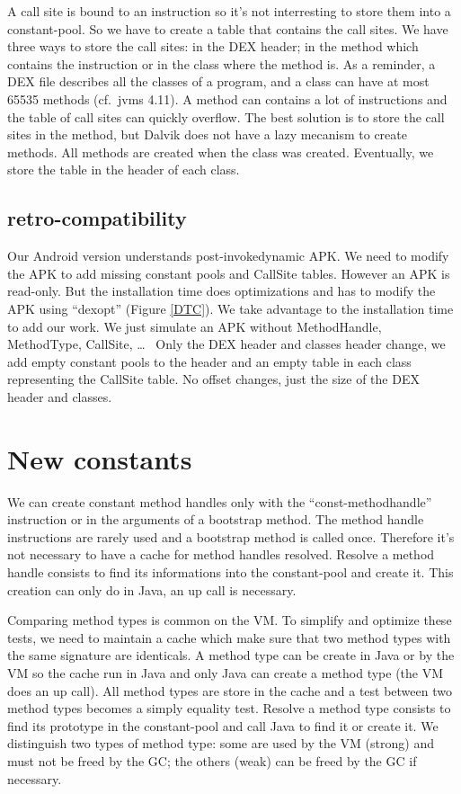 \documentclass{sig-alternate}
\def \DALVIK{Dalvik\xspace}
\def \ANDROID{Android\xspace}
\begin{document}
    A call site is bound to an instruction so it's not interresting to store them into a constant-pool.
    So we have to create a table that contains the call sites.
    We have three ways to store the call sites: in the DEX header; in the method which contains the instruction or in the class where the method is.
    As a reminder, a DEX file describes all the classes of a program, and a class can have at most 65535 methods (cf.~jvms 4.11).
    A method can contains a lot of instructions and the table of call sites can quickly overflow.
    The best solution is to store the call sites in the method, but \DALVIK does not have a lazy mecanism to create methods.
    All methods are created when the class was created.
    Eventually, we store the table in the header of each class.

  \subsection{retro-compatibility}
    Our \ANDROID version understands post-invokedynamic APK.
    We need to modify the APK to add missing constant pools and CallSite tables.
    However an APK is read-only.
    But the installation time does optimizations and has to modify the APK using ``dexopt'' (Figure \ref{DTC}).
    We take advantage to the installation time to add our work.
    We just simulate an APK without MethodHandle, MethodType, CallSite, \dots~%
    Only the DEX header and classes header change, we add empty constant pools to the header
    and an empty table in each class representing the CallSite table.
    No offset changes, just the size of the DEX header and classes.

\section{New constants}

  We can create constant method handles only with the ``const-methodhandle'' instruction or in the arguments of a bootstrap method.
  The method handle instructions are rarely used and a bootstrap method is called once.
  Therefore it's not necessary to have a cache for method handles resolved.
  Resolve a method handle consists to find its informations into the constant-pool and create it.
  This creation can only do in Java, an up call is necessary.

  Comparing method types is common on the VM.
  To simplify and optimize these tests, we need to maintain a cache which make sure that two method types with the same signature are identicals.
  A method type can be create in Java or by the VM so the cache run in Java and only Java can create a method type (the VM does an up call).
  All method types are store in the cache and a test between two method types becomes a simply equality test.
  Resolve a method type consists to find its prototype in the constant-pool and call Java to find it or create it.
  We distinguish two types of method type: some are used by the VM (strong) and must not be freed by the GC; the others (weak) can be freed by the GC if necessary.
\end{document}
